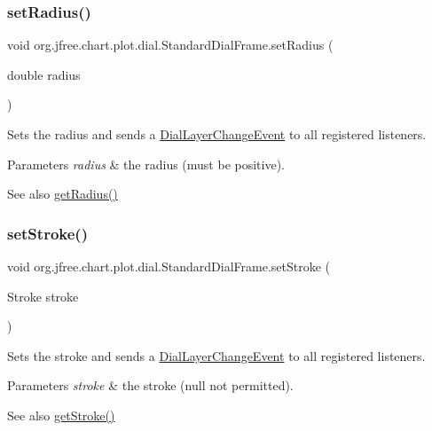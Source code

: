 \subsubsection{\texorpdfstring{set\+Radius()}{setRadius()}}
{\footnotesize\ttfamily void org.\+jfree.\+chart.\+plot.\+dial.\+Standard\+Dial\+Frame.\+set\+Radius (\begin{DoxyParamCaption}\item[{double}]{radius }\end{DoxyParamCaption})}

Sets the radius and sends a \mbox{\hyperlink{classorg_1_1jfree_1_1chart_1_1plot_1_1dial_1_1_dial_layer_change_event}{Dial\+Layer\+Change\+Event}} to all registered listeners.


\begin{DoxyParams}{Parameters}
{\em radius} & the radius (must be positive).\\
\hline
\end{DoxyParams}
\begin{DoxySeeAlso}{See also}
\mbox{\hyperlink{classorg_1_1jfree_1_1chart_1_1plot_1_1dial_1_1_standard_dial_frame_a639863a0f87163756360dc72f3faa719}{get\+Radius()}} 
\end{DoxySeeAlso}
\mbox{\label{classorg_1_1jfree_1_1chart_1_1plot_1_1dial_1_1_standard_dial_frame_a8636b33867fa14b44589e7f20fc33ec1}} 
\subsubsection{\texorpdfstring{set\+Stroke()}{setStroke()}}
{\footnotesize\ttfamily void org.\+jfree.\+chart.\+plot.\+dial.\+Standard\+Dial\+Frame.\+set\+Stroke (\begin{DoxyParamCaption}\item[{Stroke}]{stroke }\end{DoxyParamCaption})}

Sets the stroke and sends a \mbox{\hyperlink{classorg_1_1jfree_1_1chart_1_1plot_1_1dial_1_1_dial_layer_change_event}{Dial\+Layer\+Change\+Event}} to all registered listeners.


\begin{DoxyParams}{Parameters}
{\em stroke} & the stroke ({\ttfamily null} not permitted).\\
\hline
\end{DoxyParams}
\begin{DoxySeeAlso}{See also}
\mbox{\hyperlink{classorg_1_1jfree_1_1chart_1_1plot_1_1dial_1_1_standard_dial_frame_acbf9547e14794fe78b448966cabe6051}{get\+Stroke()}} 
\end{DoxySeeAlso}


